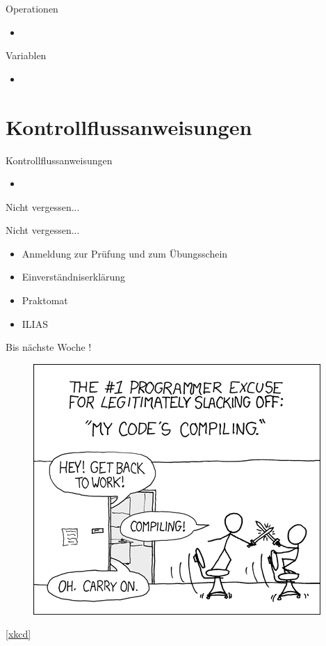 \documentclass[18pt]{beamer}
\begin{document}
\begin{frame}{Operationen}
    \begin{itemize}
        \item
    \end{itemize}
\end{frame}

\begin{frame}{Variablen}
    \begin{itemize}
        \item
    \end{itemize}
\end{frame}

\section{Kontrollflussanweisungen}

\begin{frame}{Kontrollflussanweisungen}
    \begin{itemize}
        \item
    \end{itemize}
\end{frame}

\appendix
\beginbackup

\begin{frame}{Nicht vergessen...}
    \begin{alertblock}{Nicht vergessen...}
        \begin{itemize}
        \item Anmeldung zur Prüfung und zum Übungsschein
        \item Einverständniserklärung
        \item Praktomat
        \item ILIAS
        \end{itemize}
    \end{alertblock}
\end{frame}

\begin{frame}{Bis nächste Woche !}
    \begin{figure}
        \includegraphics[scale=0.5]{img/compiling.png}
    \end{figure}
    \href{https://xkcd.com/303/}{[xkcd]}
\end{frame}

\backupend
\end{document}
